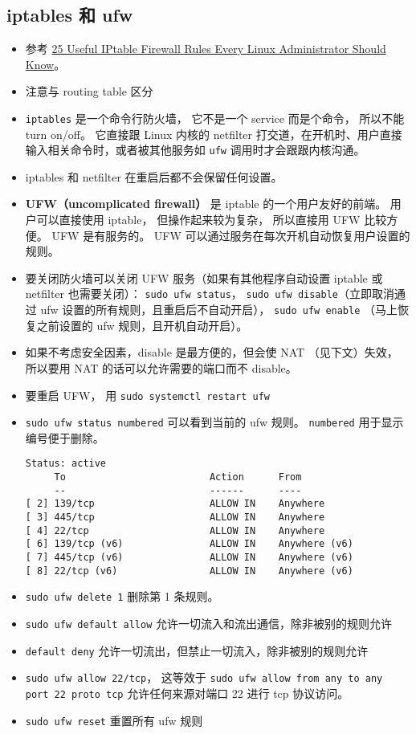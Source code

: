 \subsection{iptables 和 ufw}
\begin{itemize}
\item 参考 \href{https://www.tecmint.com/linux-iptables-firewall-rules-examples-commands/}{25 Useful IPtable Firewall Rules Every Linux Administrator Should Know}。
\item 注意与 routing table 区分
\item \verb|iptables| 是一个命令行防火墙， 它不是一个 service 而是个命令， 所以不能 turn on/off。 它直接跟 Linux 内核的 netfilter 打交道，在开机时、用户直接输入相关命令时，或者被其他服务如 \verb`ufw` 调用时才会跟跟内核沟通。
\item iptables 和 netfilter 在重启后都不会保留任何设置。
\item \textbf{UFW（uncomplicated firewall）} 是 iptable 的一个用户友好的前端。 用户可以直接使用 iptable， 但操作起来较为复杂， 所以直接用 UFW 比较方便。 UFW 是有服务的。 UFW 可以通过服务在每次开机自动恢复用户设置的规则。
\item 要关闭防火墙可以关闭 UFW 服务（如果有其他程序自动设置 iptable 或 netfilter 也需要关闭）： \verb|sudo ufw status|， \verb|sudo ufw disable|（立即取消通过 ufw 设置的所有规则，且重启后不自动开启）， \verb|sudo ufw enable| （马上恢复之前设置的 ufw 规则，且开机自动开启）。
\item 如果不考虑安全因素，disable 是最方便的，但会使 NAT （见下文）失效， 所以要用 NAT 的话可以允许需要的端口而不 disable。
\item 要重启 UFW， 用 \verb|sudo systemctl restart ufw|
\item \verb`sudo ufw status numbered` 可以看到当前的 ufw 规则。 \verb`numbered` 用于显示编号便于删除。
\begin{lstlisting}[language=none]
Status: active
     To                         Action      From
     --                         ------      ----
[ 2] 139/tcp                    ALLOW IN    Anywhere
[ 3] 445/tcp                    ALLOW IN    Anywhere
[ 4] 22/tcp                     ALLOW IN    Anywhere
[ 6] 139/tcp (v6)               ALLOW IN    Anywhere (v6)
[ 7] 445/tcp (v6)               ALLOW IN    Anywhere (v6)
[ 8] 22/tcp (v6)                ALLOW IN    Anywhere (v6)
\end{lstlisting}
\item \verb`sudo ufw delete 1` 删除第 1 条规则。
\item \verb`sudo ufw default allow` 允许一切流入和流出通信，除非被别的规则允许
\item \verb`default deny` 允许一切流出，但禁止一切流入，除非被别的规则允许
\item \verb`sudo ufw allow 22/tcp`， 这等效于 \verb`sudo ufw allow from any to any port 22 proto tcp` 允许任何来源对端口 22 进行 tcp 协议访问。
\item \verb`sudo ufw reset` 重置所有 ufw 规则
\end{itemize}

